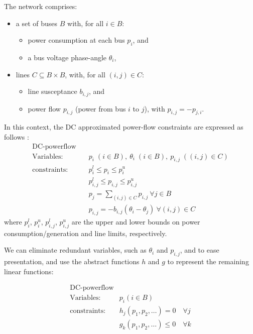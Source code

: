 The network comprises:
\begin{itemize}
    \item a set of buses $B$ with, for all $i\in B$:
    \begin{itemize} 
        \item power consumption at each bus $p_i$, and 
        \item a bus voltage phase-angle $\theta_i$,
    \end{itemize}
    \item lines 
    $C\subseteq B\times B$, with, for all $(i,j)\in C$: 
        \begin{itemize} 
        \item line susceptance $b_{i,j}$, and 
        \item power flow $p_{i,j}$ (power from bus $i$ to $j$), with $p_{i,j}=-p_{j,i}$. 
    \end{itemize}
\end{itemize}
In this context, the DC approximated power-flow constraints are expressed as follows \cite{Wang1}:
\begin{equation}
\label{dcopf1}
\begin{aligned}
\text{DC-powerflow} \quad& \\
\text{Variables:} \quad&  p_i\; (i\in B),\ \theta_i\; (i\in B),\ p_{i,j}\; ((i,j)\in C) \\
\text{constraints:} \quad& p_i^{l}\le p_i \le p_i^{u} \\
&p_{i,j}^l \le p_{i,j} \le p_{i,j}^u \\
&p_j = \sum_{(i,j)\in C}p_{i,j}~\forall j\in B\\
&p_{i,j} = -b_{i,j}(\theta_i - \theta_j) ~\forall(i,j)\in C
\end{aligned}
\end{equation}
where $p_i^{l}$, $p_i^{u}$, $p_{i,j}^l$, $p_{i,j}^u$ are the upper and lower bounds on power consumption/generation and line limits, respectively.

We can eliminate redundant variables, such as $\theta_i$ and $p_{i,j}$, and to ease presentation, and use the abstract functions $h$ and $g$ to represent the remaining linear functions:

\begin{equation}
\label{dcopf2}
\begin{aligned}
\text{DC-powerflow}\\
\text{Variables:}\quad & p_i (i\in B) \\
\text{constraints:}\quad & h_j(p_1,p_2,\dots)=0\quad \forall j\\
& g_k(p_1,p_2,\dots)\le 0 \quad \forall k
\end{aligned}
\end{equation}

